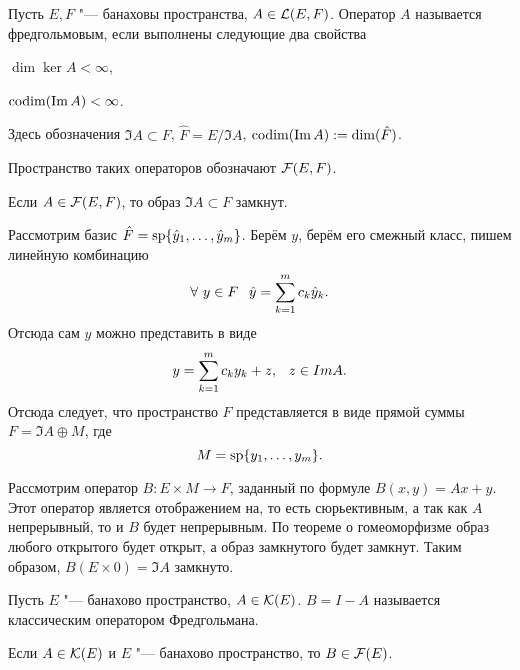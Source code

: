 \begin{Def}
  Пусть $E,F$ "--- банаховы пространства, $A\in\L(E,F)$. Оператор $A$ называется фредгольмовым, если выполнены следующие два свойства
\begin{roItems}
\item $\dim\ker A<\infty$,
\item $\codim(\Im A)<\infty$.
\end{roItems}
Здесь обозначения $\Im A\subset F$, $\hat F = E/\Im A$, $\codim (\Im A):=\dim(\hat F)$.

Пространство таких операторов обозначают $\FF(E,F)$.

\end{Def}
\begin{Lem}
Если $A\in\FF(E,F)$, то образ $\Im A\subset F$ замкнут.
\end{Lem}
\begin{Proof}
  Рассмотрим базис $\hat F = \sp\{\hat y_1,\dots,\hat y_m\}$. Берём $y$, берём его смежный класс, пишем линейную комбинацию
\[
  \forall\ y\in F\pau \hat y = \RY k1m c_k\hat y_k.
\]
Отсюда сам $y$ можно представить в виде
\[
  y = \RY k1m c_k y_k + z,\pau z\in Im A.
\]
Отсюда следует, что пространство $F$ представляется в виде прямой суммы $F = \Im A \oplus M$, где
\[
  M = \sp\{y_1,\dots,y_m\}.
\]

Рассмотрим оператор $B\colon E\times M\to F$, заданный по формуле $B(x,y) = Ax + y$. Этот оператор является отображением на, то есть сюрьективным, а так как $A$ непрерывный, то и $B$ будет непрерывным.
По теореме о гомеоморфизме образ любого открытого будет открыт, а образ замкнутого будет замкнут. Таким образом, $B(E\times 0) = \Im A$ замкнуто.
\end{Proof}
\begin{Def}
  Пусть $E$ "--- банахово пространство, $A\in \K(E)$. $B = I-A$ называется классическим оператором Фредгольмана.
\end{Def}
\begin{The}
Если $A\in\K(E)$ и $E$ "--- банахово пространство, то $B\in\FF(E)$.
\end{The}
